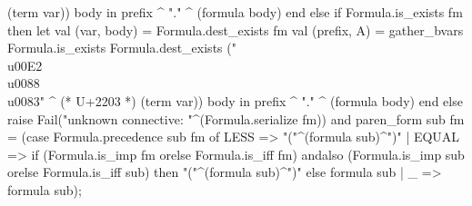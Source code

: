                                     (term var))
                                   body
  in prefix ^ "." ^ (formula body) end
  else if Formula.is_exists fm
  then let
    val (var, body) = Formula.dest_exists fm
    val (prefix, A) = gather_bvars Formula.is_exists
                                   Formula.dest_exists
                                   ("\\u00E2\\u0088\\u0083" ^ (* U+2203 *)
                                    (term var))
                                   body
  in prefix ^ "." ^ (formula body) end
  else raise Fail("unknown connective: "^(Formula.serialize fm))
and paren_form sub fm =
    (case Formula.precedence sub fm of
      LESS => "("^(formula sub)^")"
    | EQUAL => if (Formula.is_imp fm orelse Formula.is_iff fm) andalso
                  (Formula.is_imp sub orelse Formula.is_iff sub)
               then "("^(formula sub)^")"
               else formula sub
    | _ => formula sub);
\eatline
